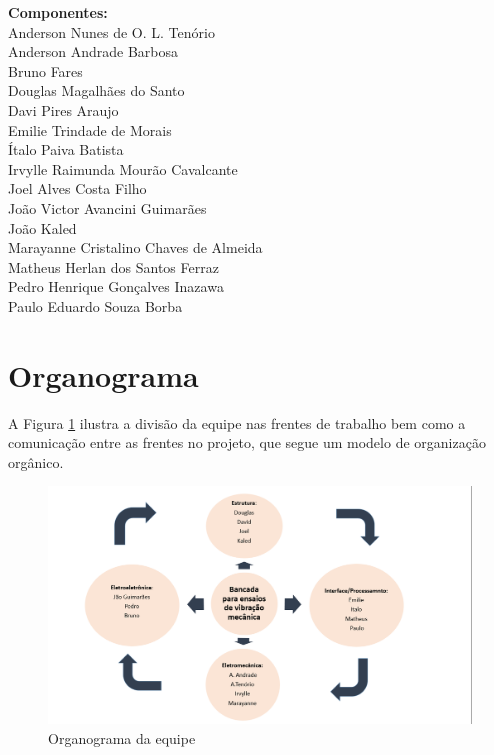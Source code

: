 \begin{apendicesenv}
\begin{itemize}
\textbf{Componentes:}\\
Anderson Nunes de O. L. Tenório\\
Anderson Andrade Barbosa\\
Bruno Fares\\
Douglas Magalhães do Santo\\
Davi Pires Araujo\\
Emilie Trindade de Morais\\
Ítalo Paiva Batista\\
Irvylle Raimunda Mourão Cavalcante\\
Joel Alves Costa Filho\\
João Victor Avancini Guimarães\\
João Kaled\\
Marayanne Cristalino Chaves de Almeida\\
Matheus Herlan dos Santos Ferraz\\
Pedro Henrique Gonçalves Inazawa\\
Paulo Eduardo Souza Borba\\
  \end{itemize}
\newpage

\section*{Organograma}

A Figura \ref{organograma} ilustra a divisão da equipe nas frentes de trabalho bem como a comunicação entre as frentes no projeto, que segue um modelo de organização orgânico.

\begin{figure}[!ht]
\centering
\includegraphics[keepaspectratio=true,scale=0.5]{figuras/organograma.png}
\caption{Organograma da equipe}
\label{organograma}
\end{figure} 


\end{apendicesenv}
